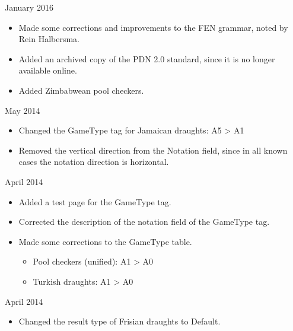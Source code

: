 \documentclass[letterpaper,10pt,english]{sphinxmanual}
\begin{document}
 January 2016
\begin{itemize}
\item {} 
\sphinxAtStartPar
Made some corrections and improvements to the FEN grammar, noted by Rein Halbersma.

\item {} 
\sphinxAtStartPar
Added an archived copy of the PDN 2.0 standard, since it is no longer available online.

\item {} 
\sphinxAtStartPar
Added Zimbabwean pool checkers.

\end{itemize}

 May 2014
\begin{itemize}
\item {} 
\sphinxAtStartPar
Changed the GameType tag for Jamaican draughts: A5 \sphinxhyphen{}\textgreater{} A1

\item {} 
\sphinxAtStartPar
Removed the vertical direction from the Notation field, since in all
known cases the notation direction is horizontal.

\end{itemize}

 April 2014
\begin{itemize}
\item {} 
\sphinxAtStartPar
Added a test page for the GameType tag.

\item {} 
\sphinxAtStartPar
Corrected the description of the notation field of the GameType tag.

\item {} 
\sphinxAtStartPar
Made some corrections to the GameType table.
\begin{itemize}
\item {} 
\sphinxAtStartPar
Pool checkers (unified): A1 \sphinxhyphen{}\textgreater{} A0

\item {} 
\sphinxAtStartPar
Turkish draughts: A1 \sphinxhyphen{}\textgreater{} A0

\end{itemize}

\end{itemize}

 April 2014
\begin{itemize}
\item {} 
\sphinxAtStartPar
Changed the result type of Frisian draughts to Default.

\end{itemize}
\end{document}
